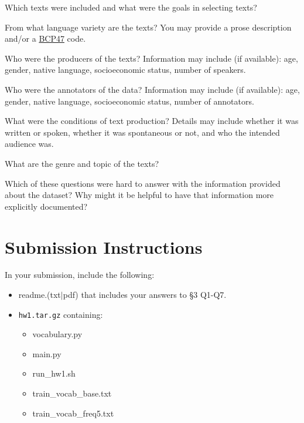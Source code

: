 \documentclass[11pt]{article}
\begin{document}
\vspace{2em}
 Which texts were included  and  what  were  the  goals  in  selecting texts?

\vspace{2em}
 From what language variety are the texts?  You may provide a prose description and/or a \href{https://tools.ietf.org/rfc/bcp/bcp47.txt}{BCP47} code.

\vspace{2em}
 Who were the producers of the texts?  Information may include (if available): age, gender, native language, socioeconomic status, number of speakers.

\vspace{2em}
 Who were the annotators of the data?  Information may include (if available): age, gender, native language, socioeconomic status, number of annotators.

\vspace{2em}
 What were the conditions of text production?  Details may include whether it was written or spoken, whether it was spontaneous or not, and who the intended audience was.

\vspace{2em}
 What are the genre and topic of the texts?

\vspace{2em}
  Which of these questions were hard to answer with the information provided about the dataset?  Why might it be helpful to have that information more explicitly documented?

\section*{Submission Instructions}

In your submission, include the following:
\begin{itemize}
  \item readme.(txt$\mid$pdf) that includes your answers to \S3 Q1-Q7. 
  \item \texttt{hw1.tar.gz} containing:
  \begin{itemize}
    \item vocabulary.py
    \item main.py
    \item run\_hw1.sh
    \item train\_vocab\_base.txt
    \item train\_vocab\_freq5.txt
  \end{itemize}
\end{itemize}
\end{document}

